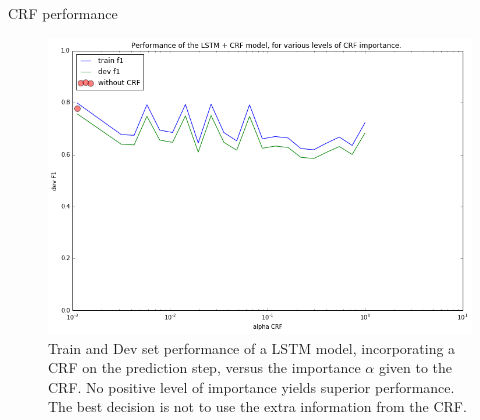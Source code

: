 \documentclass[final]{beamer}
\newlength{\onecolwid}
\begin{document}
\begin{frame}[t]
\begin{columns}[t]
\begin{column}{\onecolwid} %


\begin{block}{CRF performance}

  \begin{figure}
  \begin{center}
  \includegraphics[width=600px]{figs/LSTM-CRF-vs-alpha-extralayer.png}
  \caption{Train and Dev set performance of a LSTM model, incorporating a CRF on the prediction step, versus the importance $\alpha$ given to the CRF. No positive level of importance yields superior performance. The best decision is not to use the extra information from the CRF. }
  \label{lstm-crf-results}
  \end{center}
  \end{figure}

\end{block}





\end{column}
\end{columns}
\end{frame}
\end{document}
